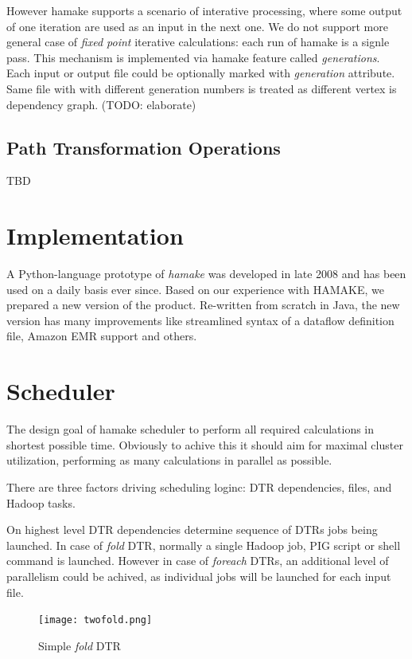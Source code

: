 \documentclass{article}
\begin{document}
However hamake supports a scenario of interative processing, where
some output of one iteration are used as an input in the next one. We
do not support more general case of \textit{fixed point} iterative
calculations: each run of hamake is a signle pass. This mechanism
is implemented via hamake feature called \textit{generations}. Each
input or output file could be optionally marked with \emph{generation}
attribute. Same file with with different generation numbers is treated
as different vertex is dependency graph. (TODO: elaborate)

\subsection{Path Transformation Operations}

TBD

\section{Implementation}

A Python-language prototype of \textit{hamake} was developed in late
2008 and has been used on a daily basis ever since. Based on our
experience with HAMAKE, we prepared a new version of the
product. Re-written from scratch in Java, the new version has many
improvements like streamlined syntax of a dataflow definition file,
Amazon EMR support and others.


\section{Scheduler}

The design goal of hamake scheduler to perform all required
calculations in shortest possible time. Obviously to achive this it
should aim for maximal cluster utilization, performing as many
calculations in parallel as possible.

There are three factors driving scheduling loginc: DTR dependencies,
files, and Hadoop tasks.

On highest level DTR dependencies determine sequence of DTRs jobs
being launched. In case of \emph{fold} DTR, normally a single Hadoop
job, PIG script or shell command is launched. However in case of
\emph{foreach} DTRs, an additional level of parallelism could be
achived, as individual jobs will be launched for each input file.

\begin{figure}[htp]
\centering
\texttt{[image: twofold.png]}
\caption{Simple \emph{fold} DTR}
\label{fig:fold1}
\end{figure}
\end{document}

